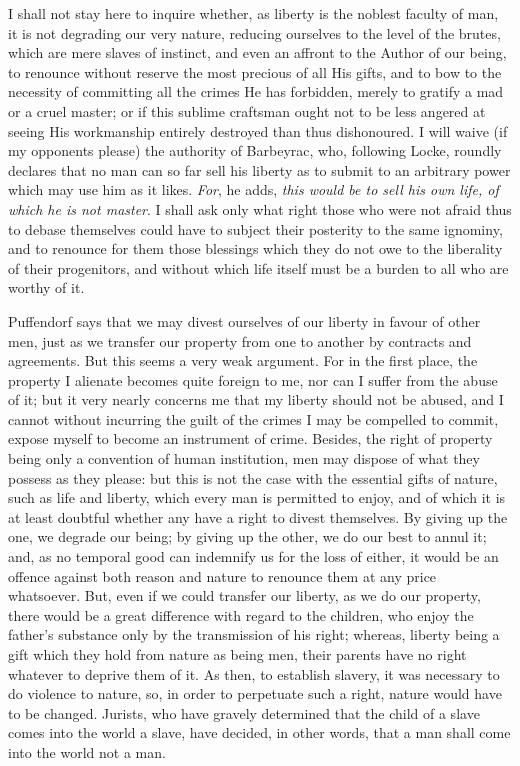 \documentclass[12pt]{report}
\begin{document}
I shall not stay here to inquire whether, as liberty is the noblest faculty of man, it is not degrading our very nature, reducing ourselves to the level of the brutes, which are mere slaves of instinct, and even an affront to the Author of our being, to renounce without reserve the most precious of all His gifts, and to bow to the necessity of committing all the crimes He has forbidden, merely to gratify a mad or a cruel master; or if this sublime craftsman ought not to be less angered at seeing His workmanship entirely destroyed than thus dishonoured. I will waive (if my opponents please) the authority of Barbeyrac, who, following Locke, roundly declares that no man can so far sell his liberty as to submit to an arbitrary power which may use him as it likes. \textit{For}, he adds, \textit{this would be to sell his own life, of which he is not master}. I shall ask only what right those who were not afraid thus to debase themselves could have to subject their posterity to the same ignominy, and to renounce for them those blessings which they do not owe to the liberality of their progenitors, and without which life itself must be a burden to all who are worthy of it.

Puffendorf says that we may divest ourselves of our liberty in favour of other men, just as we transfer our property from one to another by contracts and agreements. But this seems a very weak argument. For in the first place, the property I alienate becomes quite foreign to me, nor can I suffer from the abuse of it; but it very nearly concerns me that my liberty should not be abused, and I cannot without incurring the guilt of the crimes I may be compelled to commit, expose myself to become an instrument of crime. Besides, the right of property being only a convention of human institution, men may dispose of what they possess as they please: but this is not the case with the essential gifts of nature, such as life and liberty, which every man is permitted to enjoy, and of which it is at least doubtful whether any have a right to divest themselves. By giving up the one, we degrade our being; by giving up the other, we do our best to annul it; and, as no temporal good can indemnify us for the loss of either, it would be an offence against both reason and nature to renounce them at any price whatsoever. But, even if we could transfer our liberty, as we do our property, there would be a great difference with regard to the children, who enjoy the father's substance only by the transmission of his right; whereas, liberty being a gift which they hold from nature as being men, their parents have no right whatever to deprive them of it. As then, to establish slavery, it was necessary to do violence to nature, so, in order to perpetuate such a right, nature would have to be changed. Jurists, who have gravely determined that the child of a slave comes into the world a slave, have decided, in other words, that a man shall come into the world not a man.
\end{document}
